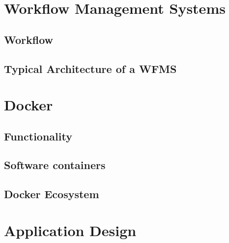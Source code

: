 \documentclass[language=english,noinputenc]{wiwwuwordrprt}
\begin{document}
  

  \chapter{Workflow Management Systems} %
  \label{cha:workflow_management_systems}
    \section{Workflow} %
    \label{sec:workflow}
    

    \section{Typical Architecture of a WFMS} %
    \label{sec:typical_architecture_of_a_wfms}
    


  \chapter{Docker} %
  \label{cha:docker}
    \section{Functionality} %
    \label{sec:functionality}
    

    \section{Software containers} %
    \label{sec:software_containers}
    

    \section{Docker Ecosystem} %
    \label{sec:docker_ecosystem}
    
  
  \chapter{Application Design} %
  \label{cha:solution_design}
\end{document}
